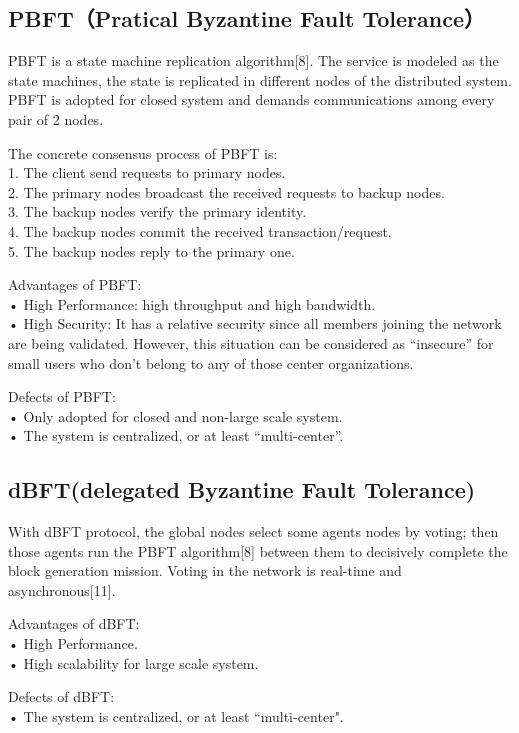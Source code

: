 \documentclass[doublespacing]{bmcart}
\begin{document}
\begin{CJK*}{UTF8}{gbsn}
\subsection{PBFT（Pratical Byzantine Fault Tolerance）}
	 
	PBFT is a state machine replication algorithm[8]. The service is modeled as the state machines, the state is replicated in different nodes of the distributed system. PBFT is adopted for closed system and demands communications among every pair of 2 nodes.
	 
	The concrete consensus process of PBFT is:
\\1. The client send requests to primary nodes.
\\2. The primary nodes broadcast the received requests to backup nodes.
\\3. The backup nodes verify the primary identity.
\\4. The backup nodes commit the received transaction/request.
\\5. The backup nodes reply to the primary one.
	
 
Advantages of PBFT:
\\• High Performance: high throughput and high bandwidth.
\\• High Security: It has a relative security since all members joining the network are being validated. However, this situation can be considered as ``insecure'' for small users who don't belong to any of those center organizations.
	 
Defects of PBFT:	
\\• Only adopted for closed and non-large scale system.
\\• The system is centralized, or at least ``multi-center''.
	
	\subsection{dBFT(delegated Byzantine Fault Tolerance)}
	 
	With dBFT protocol, the global nodes select some agents nodes by voting; then those agents run the PBFT algorithm[8] between them to decisively complete the block generation mission. Voting in the network is real-time and asynchronous[11].
	
	 
Advantages of dBFT:
\\• High Performance.
\\• High scalability for large scale system.
	 
Defects of dBFT:	
\\• The system is centralized, or at least ``multi-center".
	

\end{CJK*}
\end{document}
